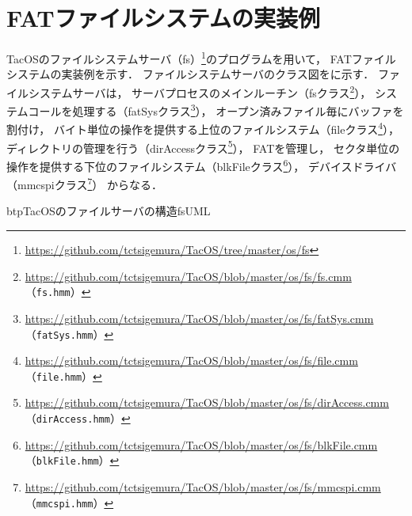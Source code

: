 \chapter{FATファイルシステムの実装例}
\label{tacosFAT}

TacOSのファイルシステムサーバ（fs）\footnote{
  \url{https://github.com/tctsigemura/TacOS/tree/master/os/fs}
}のプログラムを用いて，
FATファイルシステムの実装例を示す．
ファイルシステムサーバのクラス図をに示す．
ファイルシステムサーバは，
サーバプロセスのメインルーチン（fsクラス\footnote{
  \url{https://github.com/tctsigemura/TacOS/blob/master/os/fs/fs.cmm}
  （\texttt{fs.hmm}）}），
システムコールを処理する（fatSysクラス\footnote{
  \url{https://github.com/tctsigemura/TacOS/blob/master/os/fs/fatSys.cmm}
  （\texttt{fatSys.hmm}）}），
オープン済みファイル毎にバッファを割付け，
バイト単位の操作を提供する上位のファイルシステム（fileクラス\footnote{
  \url{https://github.com/tctsigemura/TacOS/blob/master/os/fs/file.cmm}
  （\texttt{file.hmm}）}），
ディレクトリの管理を行う（dirAccessクラス\footnote{
  \url{https://github.com/tctsigemura/TacOS/blob/master/os/fs/dirAccess.cmm}
  （\texttt{dirAccess.hmm}）}），
FATを管理し，
セクタ単位の操作を提供する下位のファイルシステム（blkFileクラス\footnote{
  \url{https://github.com/tctsigemura/TacOS/blob/master/os/fs/blkFile.cmm}
  （\texttt{blkFile.hmm}）}），
デバイスドライバ（mmcspiクラス\footnote{
  \url{https://github.com/tctsigemura/TacOS/blob/master/os/fs/mmcspi.cmm}
  （\texttt{mmcspi.hmm}）}）
からなる．

\begin{myfig}{btp}{TacOSのファイルサーバの構造}{fsUML}
\end{myfig}

